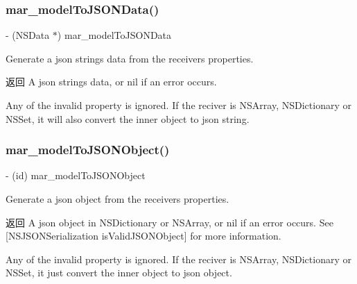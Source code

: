 \subsubsection{\texorpdfstring{mar\+\_\+model\+To\+J\+S\+O\+N\+Data()}{mar\_modelToJSONData()}}
{\footnotesize\ttfamily -\/ (N\+S\+Data $\ast$) mar\+\_\+model\+To\+J\+S\+O\+N\+Data \begin{DoxyParamCaption}{ }\end{DoxyParamCaption}}

Generate a json string\textquotesingle{}s data from the receiver\textquotesingle{}s properties.

\begin{DoxyReturn}{返回}
A json string\textquotesingle{}s data, or nil if an error occurs.
\end{DoxyReturn}
Any of the invalid property is ignored. If the reciver is {\ttfamily N\+S\+Array}, {\ttfamily N\+S\+Dictionary} or {\ttfamily N\+S\+Set}, it will also convert the inner object to json string. \mbox{\label{category_n_s_object_07_m_a_r_model_08_aeacba89acb57ff6cae02947236f16320}} 
\subsubsection{\texorpdfstring{mar\+\_\+model\+To\+J\+S\+O\+N\+Object()}{mar\_modelToJSONObject()}}
{\footnotesize\ttfamily -\/ (id) mar\+\_\+model\+To\+J\+S\+O\+N\+Object \begin{DoxyParamCaption}{ }\end{DoxyParamCaption}}

Generate a json object from the receiver\textquotesingle{}s properties.

\begin{DoxyReturn}{返回}
A json object in {\ttfamily N\+S\+Dictionary} or {\ttfamily N\+S\+Array}, or nil if an error occurs. See \mbox{[}N\+S\+J\+S\+O\+N\+Serialization is\+Valid\+J\+S\+O\+N\+Object\mbox{]} for more information.
\end{DoxyReturn}
Any of the invalid property is ignored. If the reciver is {\ttfamily N\+S\+Array}, {\ttfamily N\+S\+Dictionary} or {\ttfamily N\+S\+Set}, it just convert the inner object to json object. \mbox{\label{category_n_s_object_07_m_a_r_model_08_a149bc95723a1d9662e8bb43de399b497}} 

